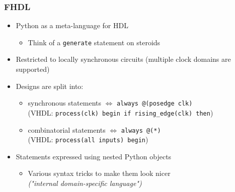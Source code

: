 \documentclass{beamer}
\begin{document}
\begin{frame}[fragile]
\frametitle{FHDL}
\begin{itemize}
\item Python as a meta-language for HDL
\begin{itemize}
\item Think of a \verb!generate! statement on steroids
\end{itemize}
\item Restricted to locally synchronous circuits (multiple clock domains are supported)
\item Designs are split into:
\begin{itemize}
\item synchronous statements $\Longleftrightarrow$ \verb!always @(posedge clk)! \\
(VHDL: \verb!process(clk) begin if rising_edge(clk) then!)
\item combinatorial statements $\Longleftrightarrow$ \verb!always @(*)! \\
(VHDL: \verb!process(all inputs) begin!)
\end{itemize}
\item Statements expressed using nested Python objects
\begin{itemize}
\item Various syntax tricks to make them look nicer \\
\textit{("internal domain-specific language")}
\end{itemize}
\end{itemize}
\end{frame}
\end{document}
